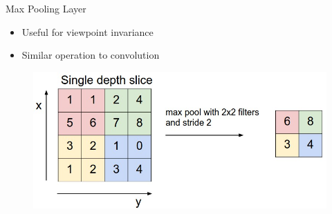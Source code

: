 \documentclass{beamer}
\begin{document}
\begin{frame}{Max Pooling Layer}
    \begin{itemize}
        \item Useful for viewpoint invariance
        \item Similar operation to convolution
    \end{itemize}


    \begin{figure}
        \includegraphics[width=\textwidth]{maxpool}
    \end{figure}
\end{frame}
\end{document}
